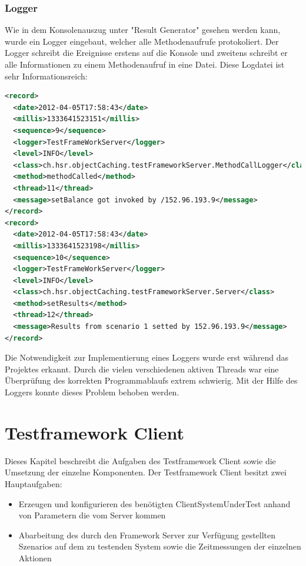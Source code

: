 \subsubsection{Logger}
\label{sec:logger}
Wie in dem Konsolenauszug unter "Result Generator" gesehen werden kann, wurde ein Logger eingebaut, welcher alle Methodenaufrufe protokoliert. Der Logger schreibt die Ereignisse erstens auf die Konsole und zweitens schreibt er alle Informationen zu einem Methodenaufruf in eine Datei. Diese Logdatei ist sehr Informationsreich:

\begin{lstlisting}[language=XML, breaklines=true]
<record>
  <date>2012-04-05T17:58:43</date>
  <millis>1333641523151</millis>
  <sequence>9</sequence>
  <logger>TestFrameWorkServer</logger>
  <level>INFO</level>
  <class>ch.hsr.objectCaching.testFrameworkServer.MethodCallLogger</class>
  <method>methodCalled</method>
  <thread>11</thread>
  <message>setBalance got invoked by /152.96.193.9</message>
</record>
<record>
  <date>2012-04-05T17:58:43</date>
  <millis>1333641523198</millis>
  <sequence>10</sequence>
  <logger>TestFrameWorkServer</logger>
  <level>INFO</level>
  <class>ch.hsr.objectCaching.testFrameworkServer.Server</class>
  <method>setResults</method>
  <thread>12</thread>
  <message>Results from scenario 1 setted by 152.96.193.9</message>
</record>
\end{lstlisting}

Die Notwendigkeit zur Im\-pl\-emen\-tie\-rung eines Log\-gers wurde erst wäh\-rend das Projektes erkannt. Durch die vielen verschiedenen aktiven Threads war eine Überprüfung des korrekten Programmablaufs extrem schwierig. Mit der Hilfe des Loggers konnte dieses Problem behoben werden.

\section{Testframework Client}
\label{sec:test-FW Client}
Dieses Kapi\-tel beschreibt die Aufgaben des Testframework Client sowie die Umsetzung der einzelne Komponenten. Der Testframework Client besitzt zwei Hauptaufgaben:
\begin{itemize}
\item Erzeugen und konfigurieren des benötigten ClientSystemUnderTest anhand von Parametern die vom Server kommen
\item Abarbeitung des durch den Framework Server zur Verfügung gestellten Szenarios auf dem zu testenden System sowie die Zeitmessungen der einzelnen Aktionen
\end{itemize}

